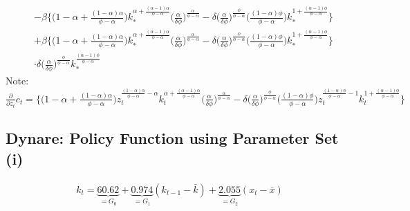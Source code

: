 \documentclass[a4paper]{article}
\theoremstyle{definition}
\begin{document}
\begin{align*}
											&- \beta \Big\{ \Big( 1-\alpha+\frac{(1-\alpha)\alpha}{\phi-\alpha} \Big) k_{*}^{\alpha+\frac{(\alpha-1)\alpha}{\phi-\alpha}} \Big( \frac{\alpha}{\delta\phi} \Big)^{\frac{\alpha}{\phi-\alpha}} - \delta \Big( \frac{\alpha}{\delta\phi} \Big)^{\frac{\phi}{\phi-\alpha}} \Big( \frac{(1-\alpha)\phi}{\phi-\alpha} \Big) k_{*}^{1+\frac{(\alpha-1)\phi}{\phi-\alpha}} \Big\} \\
											&+ \beta \Big\{ \Big( 1-\alpha+\frac{(1-\alpha)\alpha}{\phi-\alpha} \Big) k_{*}^{\alpha+\frac{(\alpha-1)\alpha}{\phi-\alpha}} \Big( \frac{\alpha}{\delta\phi} \Big)^{\frac{\alpha}{\phi-\alpha}} - \delta \Big( \frac{\alpha}{\delta\phi} \Big)^{\frac{\phi}{\phi-\alpha}} \Big( \frac{(1-\alpha)\phi}{\phi-\alpha} \Big) k_{*}^{1+\frac{(\alpha-1)\phi}{\phi-\alpha}} \Big\}\\
											& \cdot \delta \Big( \frac{\alpha}{\delta\phi} \Big)^{\frac{\phi}{\phi-\alpha}} k_{*}^{\frac{(\alpha-1)\phi}{\phi-\alpha}}						
	\end{align*}
Note: $\frac{\partial}{\partial z_t}c_t = \Big\{ \Big( 1-\alpha+\frac{(1-\alpha)\alpha}{\phi-\alpha} \Big) z_{t}^{\frac{(1-\alpha)\alpha}{\phi-\alpha}-\alpha} k_{t}^{\alpha+\frac{(\alpha-1)\alpha}{\phi-\alpha}} \Big( \frac{\alpha}{\delta\phi} \Big)^{\frac{\alpha}{\phi-\alpha}} - \delta \Big( \frac{\alpha}{\delta\phi} \Big)^{\frac{\phi}{\phi-\alpha}} \Big( \frac{(1-\alpha)\phi}{\phi-\alpha} \Big) z_{t}^{\frac{(1-\alpha)\phi}{\phi-\alpha}-1}k_{t}^{1+\frac{(\alpha-1)\phi}{\phi-\alpha}} \Big\}$



%
%
%
%
%
%
%
%
%
%
%
%
%
%
%
%
\newpage
\subsection{Dynare: Policy Function using Parameter Set (i)}
	\begin{align*}
	k_t = \underbrace{60.62}_{=G_0} + \underbrace{0.974}_{=G_1} (k_{t-1}-\bar k) + \underbrace{2.055}_{=G_2} (x_t-\bar x)
	\end{align*}
\end{document}
